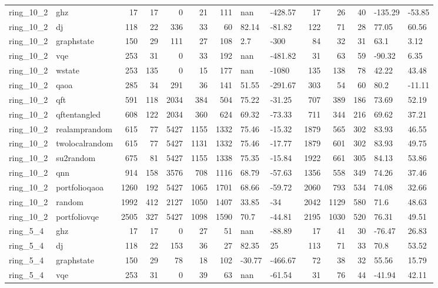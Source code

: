 \begin{longtable}{llrrrrrllrrrll}
ring\_10\_2 & ghz & 17 & 17 & 0 & 21 & 111 & nan & -428.57 & 17 & 26 & 40 & -135.29 & -53.85 \\
ring\_10\_2 & dj & 118 & 22 & 336 & 33 & 60 & 82.14 & -81.82 & 122 & 71 & 28 & 77.05 & 60.56 \\
ring\_10\_2 & graphstate & 150 & 29 & 111 & 27 & 108 & 2.7 & -300 & 84 & 32 & 31 & 63.1 & 3.12 \\
ring\_10\_2 & vqe & 253 & 31 & 0 & 33 & 192 & nan & -481.82 & 31 & 63 & 59 & -90.32 & 6.35 \\
ring\_10\_2 & wstate & 253 & 135 & 0 & 15 & 177 & nan & -1080 & 135 & 138 & 78 & 42.22 & 43.48 \\
ring\_10\_2 & qaoa & 285 & 34 & 291 & 36 & 141 & 51.55 & -291.67 & 303 & 54 & 60 & 80.2 & -11.11 \\
ring\_10\_2 & qft & 591 & 118 & 2034 & 384 & 504 & 75.22 & -31.25 & 707 & 389 & 186 & 73.69 & 52.19 \\
ring\_10\_2 & qftentangled & 608 & 122 & 2034 & 360 & 624 & 69.32 & -73.33 & 711 & 344 & 216 & 69.62 & 37.21 \\
ring\_10\_2 & realamprandom & 615 & 77 & 5427 & 1155 & 1332 & 75.46 & -15.32 & 1879 & 565 & 302 & 83.93 & 46.55 \\
ring\_10\_2 & twolocalrandom & 615 & 77 & 5427 & 1131 & 1332 & 75.46 & -17.77 & 1879 & 601 & 302 & 83.93 & 49.75 \\
ring\_10\_2 & su2random & 675 & 81 & 5427 & 1155 & 1338 & 75.35 & -15.84 & 1922 & 661 & 305 & 84.13 & 53.86 \\
ring\_10\_2 & qnn & 914 & 158 & 3576 & 708 & 1116 & 68.79 & -57.63 & 1356 & 558 & 349 & 74.26 & 37.46 \\
ring\_10\_2 & portfolioqaoa & 1260 & 192 & 5427 & 1065 & 1701 & 68.66 & -59.72 & 2060 & 793 & 534 & 74.08 & 32.66 \\
ring\_10\_2 & random & 1992 & 412 & 2127 & 1050 & 1407 & 33.85 & -34 & 2042 & 1129 & 580 & 71.6 & 48.63 \\
ring\_10\_2 & portfoliovqe & 2505 & 327 & 5427 & 1098 & 1590 & 70.7 & -44.81 & 2195 & 1030 & 520 & 76.31 & 49.51 \\
ring\_5\_4 & ghz & 17 & 17 & 0 & 27 & 51 & nan & -88.89 & 17 & 41 & 30 & -76.47 & 26.83 \\
ring\_5\_4 & dj & 118 & 22 & 153 & 36 & 27 & 82.35 & 25 & 113 & 71 & 33 & 70.8 & 53.52 \\
ring\_5\_4 & graphstate & 150 & 29 & 78 & 18 & 102 & -30.77 & -466.67 & 72 & 38 & 32 & 55.56 & 15.79 \\
ring\_5\_4 & vqe & 253 & 31 & 0 & 39 & 63 & nan & -61.54 & 31 & 76 & 44 & -41.94 & 42.11 \\

\end{longtable}
